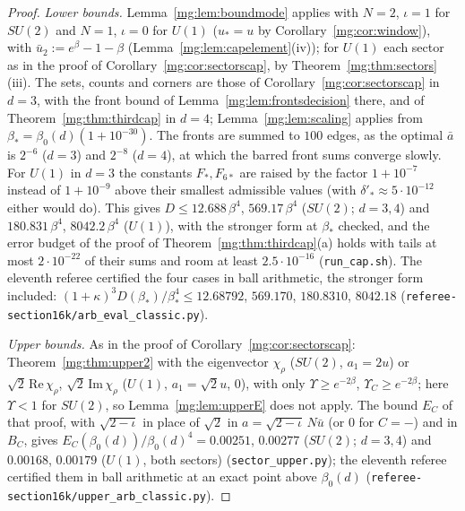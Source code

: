 \documentclass[11pt,a4paper]{article}
\theoremstyle{definition}
\theoremstyle{remark}
\begin{document}
\begin{proof}
\emph{Lower bounds.} Lemma~\ref{mg:lem:boundmode} applies with $N=2$, $\iota=1$ for $SU(2)$ and $N=1$, $\iota=0$ for $U(1)$ ($u_*=u$ by Corollary~\ref{mg:cor:window}), with
$\bar u_2:=e^\beta-1-\beta$ (Lemma~\ref{mg:lem:capelement}(iv)); for $U(1)$ each sector as in the proof of Corollary~\ref{mg:cor:sectorscap}, by Theorem~\ref{mg:thm:sectors}(iii). The sets,
counts and corners are those of Corollary~\ref{mg:cor:sectorscap} in $d=3$, with the front bound of Lemma~\ref{mg:lem:frontsdecision} there, and of Theorem~\ref{mg:thm:thirdcap} in $d=4$;
Lemma~\ref{mg:lem:scaling} applies from $\beta_*=\beta_0(d)(1+10^{-30})$. The fronts are summed to $100$ edges, as the optimal $\bar a$ is $2^{-6}$ ($d=3$) and $2^{-8}$ ($d=4$), at which the
barred front sums converge slowly. For $U(1)$ in $d=3$ the constants $F_*,F_{6*}$ are raised by the factor $1+10^{-7}$ instead of $1+10^{-9}$ above their smallest admissible values (with
$\delta'_*\approx5\cdot10^{-12}$ either would do). This gives $D\le12.688\,\beta^4$, $569.17\,\beta^4$ ($SU(2)$; $d=3,4$) and $180.831\,\beta^4$, $8042.2\,\beta^4$ ($U(1)$), with the stronger form
at $\beta_*$ checked, and the error budget of the proof of Theorem~\ref{mg:thm:thirdcap}(a) holds with tails at most $2\cdot10^{-22}$ of their sums and room at least $2.5\cdot10^{-16}$
(\texttt{run\_cap.sh}). The eleventh referee certified the four cases in ball arithmetic, the stronger form included: $(1+\kappa)^3D(\beta_*)/\beta_*^4\le12.68792$, $569.170$, $180.8310$,
$8042.18$ (\texttt{referee-section16k/\allowbreak arb\_eval\_classic.py}).

\emph{Upper bounds.} As in the proof of Corollary~\ref{mg:cor:sectorscap}: Theorem~\ref{mg:thm:upper2} with the eigenvector $\chi_\rho$ ($SU(2)$, $a_1=2u$) or $\sqrt2\,\mathrm{Re}\,\chi_\rho$,
$\sqrt2\,\mathrm{Im}\,\chi_\rho$ ($U(1)$, $a_1=\sqrt2u$, $0$), with only $\Upsilon\ge e^{-2\beta}$, $\Upsilon_C\ge e^{-2\beta}$; here $\Upsilon<1$ for $SU(2)$, so Lemma~\ref{mg:lem:upperE} does not
apply. The bound $E_C$ of that proof, with $\sqrt{2-\iota}$ in place of $\sqrt2$ in $a=\sqrt{2-\iota}\,N\bar u$ (or $0$ for $C=-$) and in $B_C$, gives $E_C(\beta_0(d))/\beta_0(d)^4=0.00251$,
$0.00277$ ($SU(2)$; $d=3,4$) and $0.00168$, $0.00179$ ($U(1)$, both sectors) (\texttt{sector\_upper.py}); the eleventh referee certified them in ball arithmetic at an exact point above
$\beta_0(d)$ (\texttt{referee-section16k/\allowbreak upper\_arb\_classic.py}).


\end{proof}
\end{document}
